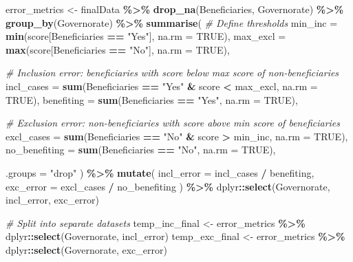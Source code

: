 \documentclass[
]{article}
\newenvironment{Shaded}{\begin{snugshade}}{\end{snugshade}}
\newcommand{\AttributeTok}[1]{\textcolor[rgb]{0.13,0.29,0.53}{#1}}
\newcommand{\CommentTok}[1]{\textcolor[rgb]{0.56,0.35,0.01}{\textit{#1}}}
\newcommand{\ConstantTok}[1]{\textcolor[rgb]{0.56,0.35,0.01}{#1}}
\newcommand{\FunctionTok}[1]{\textcolor[rgb]{0.13,0.29,0.53}{\textbf{#1}}}
\newcommand{\NormalTok}[1]{#1}
\newcommand{\OtherTok}[1]{\textcolor[rgb]{0.56,0.35,0.01}{#1}}
\newcommand{\SpecialCharTok}[1]{\textcolor[rgb]{0.81,0.36,0.00}{\textbf{#1}}}
\newcommand{\StringTok}[1]{\textcolor[rgb]{0.31,0.60,0.02}{#1}}
\begin{document}
\begin{Shaded}
\begin{Highlighting}[]
\NormalTok{error\_metrics }\OtherTok{\textless{}{-}}\NormalTok{ finalData }\SpecialCharTok{\%\textgreater{}\%}
  \FunctionTok{drop\_na}\NormalTok{(Beneficiaries, Governorate) }\SpecialCharTok{\%\textgreater{}\%}
  \FunctionTok{group\_by}\NormalTok{(Governorate) }\SpecialCharTok{\%\textgreater{}\%}
  \FunctionTok{summarise}\NormalTok{(}
    \CommentTok{\# Define thresholds}
    \AttributeTok{min\_inc =} \FunctionTok{min}\NormalTok{(score[Beneficiaries }\SpecialCharTok{==} \StringTok{"Yes"}\NormalTok{], }\AttributeTok{na.rm =} \ConstantTok{TRUE}\NormalTok{),}
    \AttributeTok{max\_excl =} \FunctionTok{max}\NormalTok{(score[Beneficiaries }\SpecialCharTok{==} \StringTok{"No"}\NormalTok{], }\AttributeTok{na.rm =} \ConstantTok{TRUE}\NormalTok{),}
    
    \CommentTok{\# Inclusion error: beneficiaries with score below max score of non{-}beneficiaries}
    \AttributeTok{incl\_cases =} \FunctionTok{sum}\NormalTok{(Beneficiaries }\SpecialCharTok{==} \StringTok{"Yes"} \SpecialCharTok{\&}\NormalTok{ score }\SpecialCharTok{\textless{}}\NormalTok{ max\_excl, }\AttributeTok{na.rm =} \ConstantTok{TRUE}\NormalTok{),}
    \AttributeTok{benefiting =} \FunctionTok{sum}\NormalTok{(Beneficiaries }\SpecialCharTok{==} \StringTok{"Yes"}\NormalTok{, }\AttributeTok{na.rm =} \ConstantTok{TRUE}\NormalTok{),}
    
    \CommentTok{\# Exclusion error: non{-}beneficiaries with score above min score of beneficiaries}
    \AttributeTok{excl\_cases =} \FunctionTok{sum}\NormalTok{(Beneficiaries }\SpecialCharTok{==} \StringTok{"No"} \SpecialCharTok{\&}\NormalTok{ score }\SpecialCharTok{\textgreater{}}\NormalTok{ min\_inc, }\AttributeTok{na.rm =} \ConstantTok{TRUE}\NormalTok{),}
    \AttributeTok{no\_benefiting =} \FunctionTok{sum}\NormalTok{(Beneficiaries }\SpecialCharTok{==} \StringTok{"No"}\NormalTok{, }\AttributeTok{na.rm =} \ConstantTok{TRUE}\NormalTok{),}
    
    \AttributeTok{.groups =} \StringTok{"drop"}
\NormalTok{  ) }\SpecialCharTok{\%\textgreater{}\%}
  \FunctionTok{mutate}\NormalTok{(}
    \AttributeTok{incl\_error =}\NormalTok{ incl\_cases }\SpecialCharTok{/}\NormalTok{ benefiting,}
    \AttributeTok{exc\_error =}\NormalTok{ excl\_cases }\SpecialCharTok{/}\NormalTok{ no\_benefiting}
\NormalTok{  ) }\SpecialCharTok{\%\textgreater{}\%}
\NormalTok{  dplyr}\SpecialCharTok{::}\FunctionTok{select}\NormalTok{(Governorate, incl\_error, exc\_error)}


\CommentTok{\# Split into separate datasets}
\NormalTok{temp\_inc\_final }\OtherTok{\textless{}{-}}\NormalTok{ error\_metrics }\SpecialCharTok{\%\textgreater{}\%}\NormalTok{ dplyr}\SpecialCharTok{::}\FunctionTok{select}\NormalTok{(Governorate, incl\_error)}
\NormalTok{temp\_exc\_final }\OtherTok{\textless{}{-}}\NormalTok{ error\_metrics }\SpecialCharTok{\%\textgreater{}\%}\NormalTok{ dplyr}\SpecialCharTok{::}\FunctionTok{select}\NormalTok{(Governorate, exc\_error)}
\end{Highlighting}
\end{Shaded}
\end{document}
